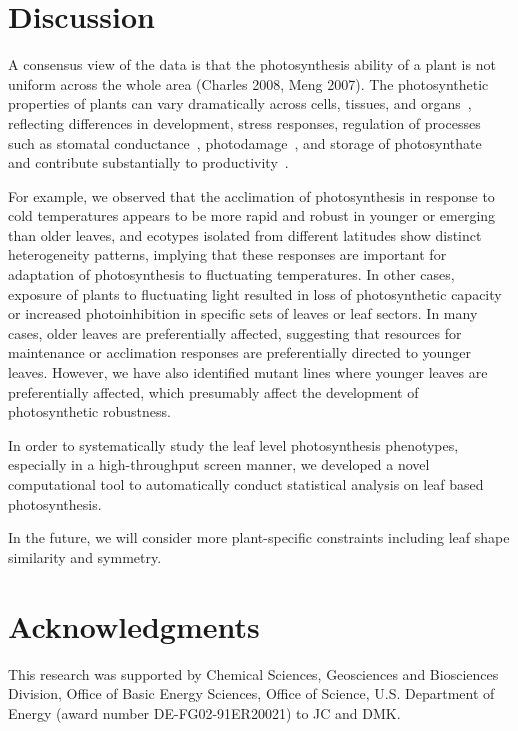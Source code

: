\documentclass{bioinfo}
\begin{document}
\section{Discussion}

A consensus view of the data is that the photosynthesis ability of a plant is not uniform across the whole area (Charles 2008, Meng 2007).
%
The photosynthetic properties of plants can vary dramatically across cells, tissues, and organs~\citep{}, reflecting differences in development, stress responses, regulation of processes such as stomatal conductance~\citep{}, photodamage~\citep{}, and storage of photosynthate~\citep{} and contribute substantially to productivity~\citep{}.

For example, we observed that the acclimation of photosynthesis in response to cold temperatures appears to be more rapid and robust in younger or emerging than older leaves, and ecotypes isolated from different latitudes show distinct heterogeneity patterns, implying that these responses are important for adaptation of photosynthesis to fluctuating temperatures.
%
In other cases, exposure of plants to fluctuating light resulted in loss of photosynthetic capacity or increased photoinhibition in specific sets of leaves or leaf sectors. In many cases, older leaves are preferentially affected, suggesting that resources for maintenance or acclimation responses are preferentially directed to younger leaves. However, we have also identified mutant lines where younger leaves are preferentially affected, which presumably affect the development of photosynthetic robustness.

In order to systematically study the leaf level photosynthesis phenotypes, especially in a high-throughput screen manner, we developed a novel computational tool to automatically conduct statistical analysis on leaf based photosynthesis.

In the future, we will consider more plant-specific constraints including leaf shape similarity and symmetry.


\section*{Acknowledgments}\scriptsize
This research was supported by Chemical Sciences, Geosciences and Biosciences Division, Office of Basic Energy Sciences, Office of Science, U.S. Department of Energy (award number DE-FG02-91ER20021) to JC and DMK.



\scriptsize
%

\end{document}
